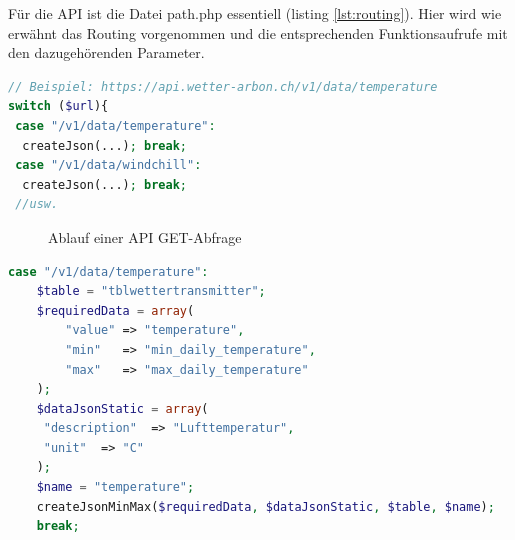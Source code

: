 Für die API ist die Datei path.php essentiell (listing \ref{lst:routing}). Hier wird wie erwähnt das Routing vorgenommen und die entsprechenden Funktionsaufrufe mit den dazugehörenden Parameter.

\vspace{3mm}
\begin{lstlisting}[label=lst:routing,caption=Routing der URL auf die richtige DB-Abfrage, language=php, style=php]
// Beispiel: https://api.wetter-arbon.ch/v1/data/temperature
switch ($url){
 case "/v1/data/temperature":
  createJson(...); break;
 case "/v1/data/windchill":
  createJson(...); break;
 //usw.
\end{lstlisting}
\vspace{3mm}

\begin{figure}[h!]
	\centering
	\caption{Ablauf einer API GET-Abfrage}
	\label{img:APIFiles}
\end{figure}



\begin{lstlisting}[label=lst:path,caption=Beispiel Case zuweisung, language=php, style=php]
case "/v1/data/temperature":
	$table = "tblwettertransmitter";
	$requiredData = array(
		"value" => "temperature",
		"min"  	=> "min_daily_temperature",
		"max"   => "max_daily_temperature"
	);
	$dataJsonStatic = array(
	 "description"  => "Lufttemperatur",
	 "unit"  => "C"
	);
	$name = "temperature";
	createJsonMinMax($requiredData, $dataJsonStatic, $table, $name);
	break;
\end{lstlisting}




